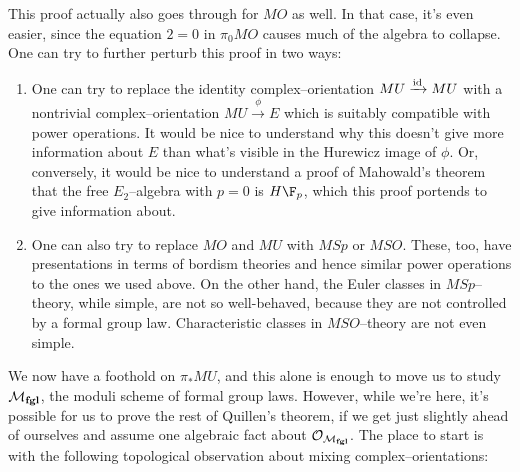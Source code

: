 \begin{remark}
This proof actually also goes through for $MO$ as well.  In that case, it's even easier, since the equation $2 = 0$ in $\pi_0 MO$ causes much of the algebra to collapse.  One can try to further perturb this proof in two ways:
\begin{enumerate}
\item One can try to replace the identity complex--orientation $MU \xrightarrow{\mathrm{id}} MU$ with a nontrivial complex--orientation $MU \xrightarrow{\phi} E$ which is suitably compatible with power operations.  It would be nice to understand why this doesn't give more information about $E$ than what's visible in the Hurewicz image of $\phi$.  Or, conversely, it would be nice to understand a proof of Mahowald's theorem that the free $E_2$--algebra with $p = 0$ is $H\F_p$, which this proof portends to give information about.
\item One can also try to replace $MO$ and $MU$ with $MSp$ or $MSO$.  These, too, have presentations in terms of bordism theories and hence similar power operations to the ones we used above.  On the other hand, the Euler classes in $MSp$--theory, while simple, are not so well-behaved, because they are not controlled by a formal group law.  Characteristic classes in $MSO$--theory are not even simple.
\end{enumerate}
\end{remark}

We now have a foothold on $\pi_* MU$, and this alone is enough to move us to study $\mathcal{M}_{\mathbf{fgl}}$, the moduli scheme of formal group laws.  However, while we're here, it's possible for us to prove the rest of Quillen's theorem, if we get just slightly ahead of ourselves and assume one algebraic fact about $\mathcal{O}_{\mathcal{M}_{\mathbf{fgl}}}$.  The place to start is with the following topological observation about mixing complex--orientations:

